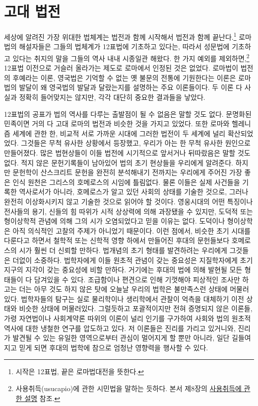 
\chapter{고대 법전}

세상에 알려진 가장 위대한 법체계는 법전과 함께 시작해서
법전과 함께 끝난다.\footnote{시작은 12표법, 끝은 로마법대전을 뜻한다.}
로마법의 해설자들은 그들의 법체계가 12표법에 기초하고 있다는,
따라서 성문법에 기초하고 있다는 취지의 말을 그들의 역사 내내 시종일관 해왔다.
한 가지 예외를 제외하면,\footnote{%
  사용취득(usucapio)에 관한 시민법을 말하는 듯하다.
  본서 제8장의 \hyperlink{usucapio}{사용취득에 관한 설명} 참조.}
12표법 이전으로 거슬러 올라가는 제도로 로마에서 인정된 것은 없었다.
로마법이 법전의 후예라는 이론, 영국법은 기억할 수 없는
옛 불문의 전통에 기원한다는 이론은
로마법의 발달이 왜 영국법의 발달과 달랐는지를 설명하는 주요 이론들이다.
두 이론 다 사실과 정확히 들어맞지는 않지만, 각각 대단히 중요한 결과들을 낳았다.

12표법의 공표가 법의 역사를 다루는 출발점이 될 수 없음은 말할 것도 없다.
문명화된 민족이면 거의 다 고대 로마의 법전과 비슷한 것을 가지고 있었다.
또한 로마와 헬레니즘 세계에 관한 한, 비교적 서로 가까운 시대에
그러한 법전이 두 세계에 널리 확산되었었다.
그것들은 무척 유사한 상황에서 등장했고, 우리가 아는 한
무척 유사한 원인으로 만들어졌다.
많은 법현상들이 이들 법전에 시기적으로 앞서거나 뒤따랐음은 말할 것도 없다.
적지 않은 문헌기록들이 남아있어 법의 초기 현상들을 우리에게 알려준다.
하지만 문헌학이 산스크리트 문헌을 완전히 분석해내기 전까지는
우리에게 주어진 가장 좋은 인식 원천은 그리스의 호메로스의 시임에 틀림없다.
물론 이들은 실제 사건들을 기록한 역사로서가 아니라,
호메로스가 알고 있던 사회의 상태를 기술한 것으로,
그러나 완전히 이상화시키지 않고 기술한 것으로 읽어야 할 것이다.
영웅시대의 어떤 특징이나 전사들의 용기, 신들의 힘 따위가
시적 상상력에 의해 과장됐을 수 있지만, 도덕적 또는 형이상학적 관념에 의해
그의 시가 오염되었다고 믿을 이유는 없다.
도덕이나 형이상학은 아직 의식적인 고찰의 주제가 아니었기 때문이다.
이런 점에서, 비슷한 초기 시대를 다룬다고 하면서
철학적 또는 신학적 영향 하에서 만들어진 후대의 문헌들보다
호메로스의 시가 훨씬 더 신뢰할 만하다.
법개념의 초기 형태를 발견하려는 우리에게 그것들은 더없이 소중하다.
법학자에게 이들 원초적 관념이 갖는 중요성은
지질학자에게 초기 지구의 지각이 갖는 중요성에 비할 만하다.
거기에는 후대의 법에 의해 발현될 모든 형태들이 다 담겨있을 수 있다.
조급함이나 편견으로 인해 기껏해야 피상적인 조사만 하고는 더는
아무 것도 하지 않은 탓에 오늘날 우리의 법학은 불만족스런 상태에 머물러있다.
법학자들의 탐구는 실로 물리학이나 생리학에서 관찰이 억측을 대체하기 이전
상태와 비슷한 상태에 머물러있다.
그럴듯하고 포괄적이지만 전혀 증명되지 않은 이론들, 가령
자연법이나 사회계약론 따위의 이론이 널리 인기를 구가하여
사회와 법의 원초적 역사에 대한 냉철한 연구를 압도하고 있다.
저 이론들은 진리를 가리고 있거니와,
진리가 발견될 수 있는 유일한 영역으로부터 관심이 멀어지게 할 뿐만 아니라,
일단 길들여지고 믿게 되면 후대의 법학에 참으로 엄청난 영향력을
행사할 수 있다.

